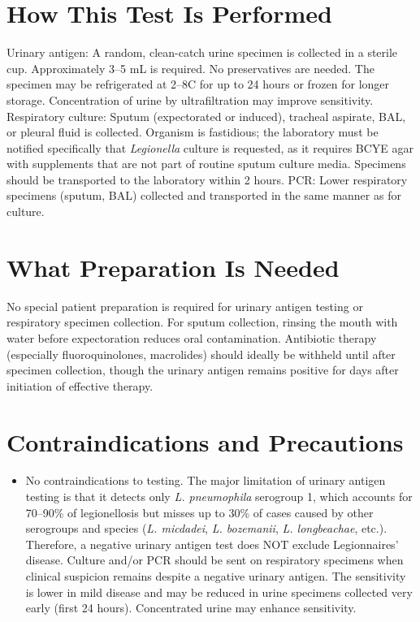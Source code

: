 \section*{How This Test Is Performed}
Urinary antigen: A random, clean-catch urine specimen is collected in a sterile cup. Approximately 3--5 mL is required. No preservatives are needed. The specimen may be refrigerated at 2--8\textdegree{}C for up to 24 hours or frozen for longer storage. Concentration of urine by ultrafiltration may improve sensitivity. Respiratory culture: Sputum (expectorated or induced), tracheal aspirate, BAL, or pleural fluid is collected. Organism is fastidious; the laboratory must be notified specifically that \textit{Legionella} culture is requested, as it requires BCYE agar with supplements that are not part of routine sputum culture media. Specimens should be transported to the laboratory within 2 hours. PCR: Lower respiratory specimens (sputum, BAL) collected and transported in the same manner as for culture.

\section*{What Preparation Is Needed}
No special patient preparation is required for urinary antigen testing or respiratory specimen collection. For sputum collection, rinsing the mouth with water before expectoration reduces oral contamination. Antibiotic therapy (especially fluoroquinolones, macrolides) should ideally be withheld until after specimen collection, though the urinary antigen remains positive for days after initiation of effective therapy.

\section*{Contraindications and Precautions}
\begin{itemize}
  \item No contraindications to testing. The major limitation of urinary antigen testing is that it detects only \textit{L. pneumophila} serogroup 1, which accounts for 70--90\% of legionellosis but misses up to 30\% of cases caused by other serogroups and species (\textit{L. micdadei}, \textit{L. bozemanii}, \textit{L. longbeachae}, etc.). Therefore, a negative urinary antigen test does NOT exclude Legionnaires' disease. Culture and/or PCR should be sent on respiratory specimens when clinical suspicion remains despite a negative urinary antigen. The sensitivity is lower in mild disease and may be reduced in urine specimens collected very early (first 24 hours). Concentrated urine may enhance sensitivity.
\end{itemize}
